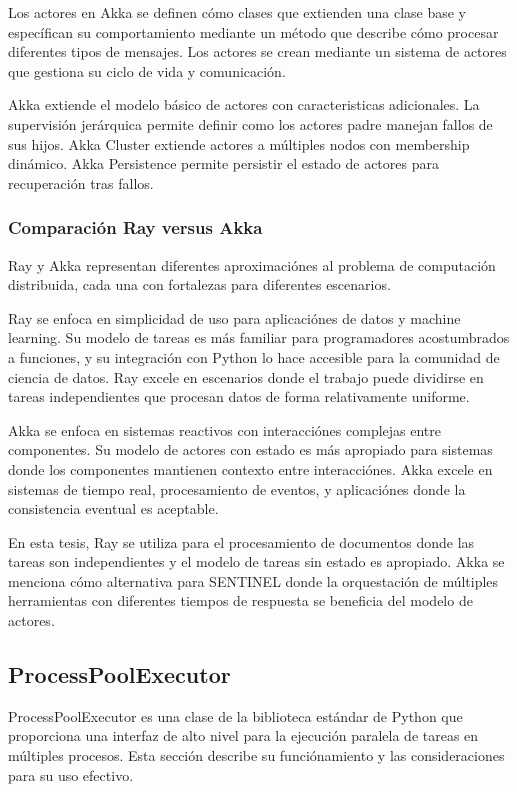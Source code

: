 \documentclass[12pt,a4paper,twoside]{book}
\begin{document}
Los actores en Akka se definen cómo clases que extienden una clase base y específican su comportamiento mediante un método que describe cómo procesar diferentes tipos de mensajes. Los actores se crean mediante un sistema de actores que gestiona su ciclo de vida y comunicación.

Akka extiende el modelo básico de actores con caracteristicas adicionales. La supervisión jerárquica permite definir como los actores padre manejan fallos de sus hijos. Akka Cluster extiende actores a múltiples nodos con membership dinámico. Akka Persistence permite persistir el estado de actores para recuperación tras fallos.

\subsubsection{Comparación Ray versus Akka}

Ray y Akka representan diferentes aproximaciónes al problema de computación distribuida, cada una con fortalezas para diferentes escenarios.

Ray se enfoca en simplicidad de uso para aplicaciónes de datos y machine learning. Su modelo de tareas es más familiar para programadores acostumbrados a funciones, y su integración con Python lo hace accesible para la comunidad de ciencia de datos. Ray excele en escenarios donde el trabajo puede dividirse en tareas independientes que procesan datos de forma relativamente uniforme.

Akka se enfoca en sistemas reactivos con interacciónes complejas entre componentes. Su modelo de actores con estado es más apropiado para sistemas donde los componentes mantienen contexto entre interacciónes. Akka excele en sistemas de tiempo real, procesamiento de eventos, y aplicaciónes donde la consistencia eventual es aceptable.

En esta tesis, Ray se utiliza para el procesamiento de documentos donde las tareas son independientes y el modelo de tareas sin estado es apropiado. Akka se menciona cómo alternativa para SENTINEL donde la orquestación de múltiples herramientas con diferentes tiempos de respuesta se beneficia del modelo de actores.

\subsection{ProcessPoolExecutor}

ProcessPoolExecutor es una clase de la biblioteca estándar de Python que proporciona una interfaz de alto nivel para la ejecución paralela de tareas en múltiples procesos. Esta sección describe su funciónamiento y las consideraciones para su uso efectivo.
\end{document}
